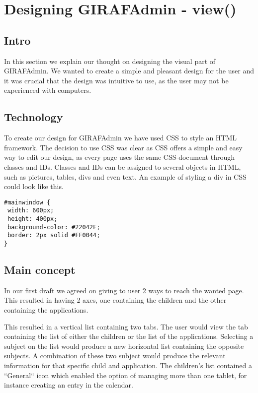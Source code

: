 \documentclass[12pt]{article}
\begin{document}
\section*{Designing GIRAFAdmin - view()}

\subsection*{Intro}
In this section we explain our thought on designing the visual part of GIRAFAdmin. We wanted to create a simple and pleasant design for the user and it was crucial that the design was intuitive to use, as the user may not be experienced with computers. 


\subsection*{Technology}
To create our design for GIRAFAdmin we have used CSS to style an HTML framework. The decision to use CSS was clear as CSS offers a simple and easy way to edit our design, as every page uses the same CSS-document through classes and IDs. Classes and IDs can be assigned to several objects in HTML, such as pictures, tables, divs and even text. An example of styling a div in CSS could look like this. 

\begin{verbatim}
#mainwindow {	
 width: 600px;
 height: 400px;
 background-color: #22042F;
 border: 2px solid #FF0044;
}
\end{verbatim}


\subsection*{Main concept}
In our first draft we agreed on giving to user 2 ways to reach the wanted page. This resulted in having 2 axes, one containing the children and the other containing the applications. 



This resulted in a vertical list containing two tabs. The user would view the tab containing the list of either the children or the list of the applications. Selecting a subject on the list would produce a new horizontal list containing the opposite subjects. A combination of these two subject would produce the relevant information for that specific child and application.
The children's list contained a ``General`` icon which enabled the option of managing more than one tablet, for instance creating an entry in the calendar. 
\end{document}
